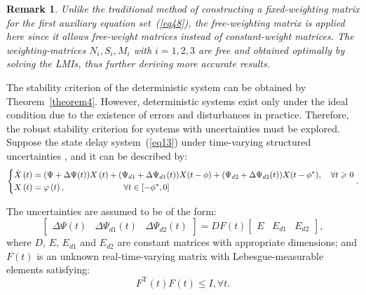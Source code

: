 \documentclass[a4paper]{cas-sc}
\newtheorem{remark}[theorem]{Remark}
\begin{document}
\begin{remark}
  Unlike the traditional method of constructing a fixed-weighting matrix for the first auxiliary equation set~(\ref{eq48}), the free-weighting matrix is applied here since it allows free-weight matrices instead of constant-weight matrices. The weighting-matrices $N_i,S_i,M_i$ with $i=1,2,3$ are free and obtained optimally by solving the LMIs, thus further deriving more accurate results.
\end{remark}

The stability criterion of the deterministic system can be obtained by Theorem~\ref{theorem4}. However, deterministic systems exist only under the ideal condition due to the existence of errors and disturbances in practice. Therefore, the robust stability criterion for systems with uncertainties must be explored. Suppose the state delay system~(\ref{eq13}) under time-varying structured uncertainties \citep{Shamma1994,Wu2021,Wu2004}, and it can be described by:
\begin{equation}
  \left\{ \begin{gathered}
    \dot X\left( t \right) = (\Psi  + \Delta \Psi (t))X\left( t \right) + ({\Psi _{d1}} + \Delta {\Psi _{d1}}(t))X(t - \phi ) + ({\Psi _{d2}} + \Delta {\Psi _{d2}}(t))X(t - {\phi ^*}),\quad \forall t \geqslant 0 \hfill \\
    X\left( t \right) = \varphi \left( t \right),\quad \quad \quad \quad \quad \quad \quad \forall t \in \left[ { - {\phi ^*},0} \right] \hfill \\
  \end{gathered}  \right..
  \label{eq411}
\end{equation}

The uncertainties are assumed to be of the form:
\begin{equation}
  \left[ {\begin{array}{*{20}{c}}
          {\Delta \Psi (t)} & {\Delta {\Psi _{d1}}(t)} & {\Delta {\Psi _{d2}}(t)}
        \end{array}} \right] = DF(t)\left[ {\begin{array}{*{20}{c}}
          E & {{E_{d1}}} & {{E_{d2}}}
        \end{array}} \right],
  \label{eq4XX}
\end{equation}
where $D$, $E$, $E_{d1}$ and $E_{d2}$ are constant matrices with appropriate dimensions; and $F(t)$ is an unknown real-time-varying matrix with Lebesgue-measurable elements satisfying:
\begin{equation}
  {F^{\text{T}}}(t)F(t) \le I,  \forall t.
  \label{eq4XX2}
\end{equation}
\end{document}
